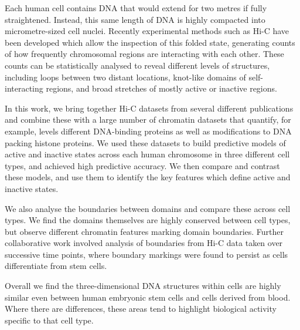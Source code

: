 \documentclass[a4paper,11pt,twoside]{scrbook}
\begin{document}
Each human cell contains DNA that would extend for two metres if fully straightened. Instead, this same length of DNA is highly compacted into micrometre-sized cell nuclei. Recently experimental methods such as Hi-C have been developed which allow the inspection of this folded state, generating counts of how frequently chromosomal regions are interacting with each other. These counts can be statistically analysed to reveal different levels of structures, including loops between two distant locations, knot-like domains of self-interacting regions, and broad stretches of mostly active or inactive regions. 

In this work, we bring together Hi-C datasets from several different publications and combine these with a large number of chromatin datasets that quantify, for example, levels different DNA-binding proteins as well as modifications to DNA packing histone proteins. We used these datasets to build predictive models of active and inactive states across each human chromosome in three different cell types, and achieved high predictive accuracy. We then compare and contrast these models, and use them to identify the key features which define active and inactive states. 

We also analyse the boundaries between domains and compare these across cell types. We find the domains themselves are highly conserved between cell types, but observe different chromatin features marking domain boundaries. Further collaborative work involved analysis of boundaries from Hi-C data taken over successive time points, where boundary markings were found to persist as cells differentiate from stem cells.

Overall we find the three-dimensional DNA structures within cells are highly similar even between human embryonic stem cells and cells derived from blood. Where there are differences, these areas tend to highlight biological activity specific to that cell type.

\clearpage

\tableofcontents
\clearpage

\listoffigures

\clearpage

\listoftables
\clearpage
\end{document}
